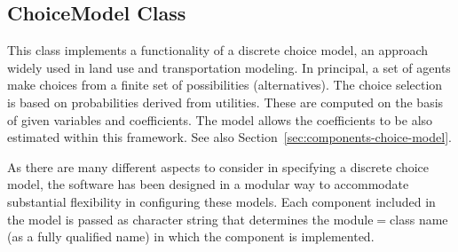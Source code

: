 \subsection{ChoiceModel Class}
\label{sec:choice-model}
%
This class implements a functionality of a discrete choice model, an approach
widely used in land use and transportation modeling. In principal, a set of
agents make choices from a finite set of possibilities (alternatives). The
choice selection is based on probabilities derived from utilities. These are
computed on the basis of given variables and coefficients. The model allows
the coefficients to be also estimated within this framework. See also Section~\ref{sec:components-choice-model}.

As there are many different aspects to consider in specifying a discrete
choice model, the software has been designed in a modular way to accommodate
substantial flexibility in configuring these models. Each component included
in the model is passed as character string that determines the module$=$class
name (as a fully qualified name) in which the component is implemented.

